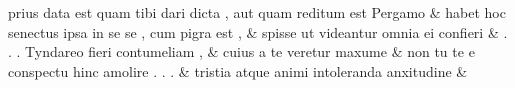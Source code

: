 \documentclass[12pt,onecolumn,twoside,a4paper]{memoir}
\begin{document}
\begin{pairs}
\begin{Leftside}
                              prius
                              data
                              est
                              quam
                              tibi
                              dari
                              dicta
                              ,
                              aut
                              quam
                              reditum
                              est
                              Pergamo \&
                         \stanza {}habet
                              hoc
                              senectus
                              ipsa
                              in
                              se
                              {
                              se
                              }
                              ,
                              cum
                              pigra
                              est
                              , & 
                     spisse
                              ut
                              videantur
                              omnia
                              {
                              ei
                              }
                              confieri \&
                         \stanza {}.
                              .
                              .
                              Tyndareo
                              fieri
                              contumeliam
                              , & 
                     cuius
                              a
                              te
                              veretur
                              maxume \&
                         \stanza {}
                     non
                              tu
                              te
                              e
                              conspectu
                              hinc
                              amolire
                              .
                              .
                              . \&
                         \stanza {}
                     tristia
                              atque
                              animi
                              intoleranda
                              anxitudine \&

\end{Leftside}
\end{pairs}
\end{document}
